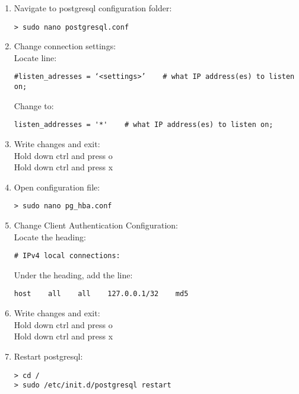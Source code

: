 \begin{enumerate}
      \item Navigate to postgresql configuration folder:
      \begin{verbatim}
> sudo nano postgresql.conf
      \end{verbatim}

      \item Change connection settings:\\Locate line: 
      \begin{verbatim}
#listen_adresses = ‘<settings>’    # what IP address(es) to listen on;
      \end{verbatim}
      Change to:
      \begin{verbatim}
listen_addresses = '*'    # what IP address(es) to listen on;
      \end{verbatim}

      \item Write changes and exit:\\
      Hold down ctrl and press o\\
      Hold down ctrl and press x

      \item Open configuration file:
      \begin{verbatim}
> sudo nano pg_hba.conf
      \end{verbatim}

      \item Change Client Authentication Configuration:\\Locate the heading: 
      \begin{verbatim}
# IPv4 local connections:
      \end{verbatim}
      Under the heading, add the line:
      \begin{verbatim}
host    all    all    127.0.0.1/32    md5
      \end{verbatim}

      \item Write changes and exit:\\
      Hold down ctrl and press o\\
      Hold down ctrl and press x

      \item Restart postgresql:
      \begin{verbatim}
> cd /
> sudo /etc/init.d/postgresql restart
      \end{verbatim}

    \end{enumerate}

